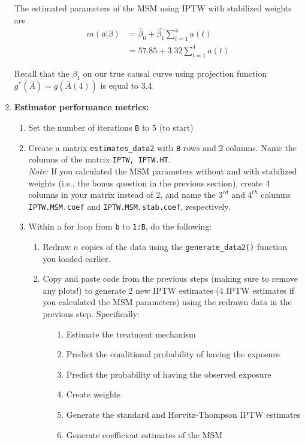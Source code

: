 \documentclass{exam}
\begin{document}
\begin{enumerate}
\begin{solution}
The estimated parameters of the MSM using IPTW with stabilized weights are 
\begin{align*}
m(\bar{a}|\beta) & = \hat{\beta}_0 + \hat{\beta_1}\sum_{t=1}^4a(t) \\
& = 57.85 + 3.32\sum_{t=1}^4a(t)
\end{align*}

Recall that the $\beta_1$ on our true causal curve using projection function $g^*(\bar{A}) = g(\bar{A}(4))$ is equal to 3.4.
\end{solution}

\item \textbf{Estimator performance metrics:}

\begin{enumerate}
\item Set the number of iterations \texttt{B} to 5 (to start)
\item Create a matrix \texttt{estimates\_data2} with \texttt{B} rows and 2 columns. Name the columns of the matrix \texttt{IPTW, IPTW.HT}. \\
\textit{Note:} If you calculated the MSM parameters without and with stabilized weights (i.e., the bonus question in the previous section), create 4 columns in your matrix instead of 2, and name the $3^{rd}$ and $4^{th}$ columns \texttt{IPTW.MSM.coef} and \texttt{IPTW.MSM.stab.coef}, respectively.
\item Within a for loop from \texttt{b} to \texttt{1:B}, do the following:
\begin{enumerate}
\item Redraw $n$ copies of the data using the \texttt{generate\_data2()} function you loaded earlier. 
\item Copy and paste code from the previous steps (making sure to remove any plots!) to generate 2 new IPTW estimates (4 IPTW estimates if you calculated the MSM parameters) using the redrawn data in the previous step. Specifically: 
\begin{enumerate}
\item[1.] Estimate the treatment mechanism
\item[2.] Predict the conditional probability of having the exposure
\item[3.] Predict the probability of having the observed exposure
\item[4.] Create weights
\item[5.] Generate the standard and Horvitz-Thompson IPTW estimates
\item[6.] Generate coefficient estimates of the MSM

\end{enumerate}
\end{enumerate}
\end{enumerate}
\end{enumerate}
\end{document}
